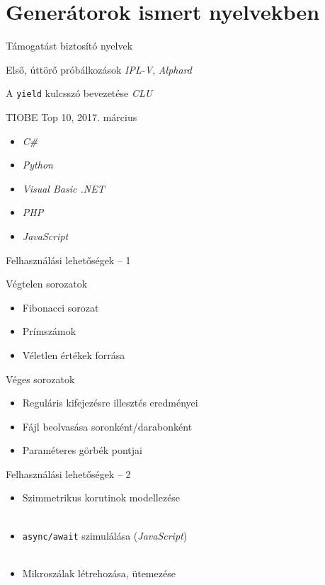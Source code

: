 \section{Generátorok ismert nyelvekben}

\begin{frame}{Támogatást biztosító nyelvek}
    \begin{block}{Első, úttörő próbálkozások}
        \indent\textit{IPL-V}, \textit{Alphard}
    \end{block}
    \begin{block}{A \texttt{yield} kulcsszó bevezetése}
        \textit{CLU}
    \end{block}
    \begin{block}{TIOBE Top 10, 2017. március}
        \begin{itemize}
            \item
            \textit{C\#}
            \item
            \textit{Python}
            \item
            \textit{Visual Basic .NET}
            \item
            \textit{PHP}
            \item
            \textit{JavaScript}
        \end{itemize}
    \end{block}
\end{frame}


\begin{frame}{Felhasználási lehetőségek -- 1}
\begin{block}{Végtelen sorozatok}
    \begin{itemize}
        \item
        Fibonacci sorozat
        \item
        Prímszámok
        \item
        Véletlen értékek forrása
    \end{itemize}
\end{block}
\begin{block}{Véges sorozatok}
    \begin{itemize}
        \item
        Reguláris kifejezésre illesztés eredményei
        \item
        Fájl beolvasása soronként/darabonként
        \item
        Paraméteres görbék pontjai
    \end{itemize}
\end{block}
\end{frame}


\begin{frame}{Felhasználási lehetőségek -- 2}
\begin{itemize}
    \item
    Szimmetrikus korutinok modellezése \\
    \hfill \\
    \item
    \texttt{async/await} szimulálása (\textit{JavaScript}) \\
    \hfill \\
    \item
    Mikroszálak létrehozása, ütemezése
\end{itemize}
\end{frame}